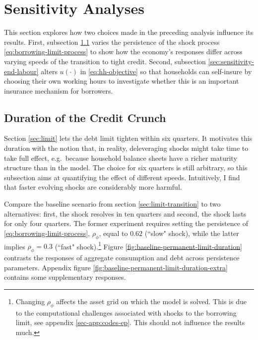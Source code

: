 \documentclass[a4paper,12pt]{article} %
\numberwithin{equation}{section} %
\numberwithin{figure}{section}
\numberwithin{table}{section}
\begin{document}
\section{Sensitivity Analyses}
\label{sec:sensitivity}

This section explores how two choices made in the preceding analysis influence its results. First, subsection \ref{sec:sensitivity-persistence} varies the persistence of the shock process \eqref{eq:borrowing-limit-process} to show how the economy's responses differ across varying speeds of the transition to tight credit. Second, subsection \ref{sec:sensitivity-end-labour} alters $u( \cdot )$ in \eqref{eq:hh-objective} so that households can self-insure by choosing their own working hours to investigate whether this is an important insurance mechanism for borrowers.

\subsection{Duration of the Credit Crunch}
\label{sec:sensitivity-persistence} 

Section \ref{sec:limit} lets the debt limit tighten within six quarters. It motivates this duration with the notion that, in reality, deleveraging shocks might take time to take full effect, e.g.~because household balance sheets have a richer maturity structure than in the model. The choice for six quarters is still arbitrary, so this subsection aims at quantifying the effect of different speeds. Intuitively, I find that faster evolving shocks are considerably more harmful.

Compare the baseline scenario from section \ref{sec:limit-transition} to two alternatives: first, the shock resolves in ten quarters and second, the shock lasts for only four quarters. The former experiment requires setting the persistence of \eqref{eq:borrowing-limit-process}, $\rho_{\phi}$, equal to $0.62$ (``slow" shock), while the latter implies $\rho_{\phi} = 0.3$ (``fast" shock).\footnote{Changing $\rho_{\phi}$ affects the asset grid on which the model is solved. This is due to the computational challenges associated with shocks to the borrowing limit, see appendix \ref{sec-app:codes-ep}. This should not influence the results much.} Figure \ref{fig:baseline-permanent-limit-duration} contrasts the responses of aggregate consumption and debt across persistence parameters. Appendix figure \ref{fig:baseline-permanent-limit-duration-extra} contains some supplementary responses.
\end{document}
